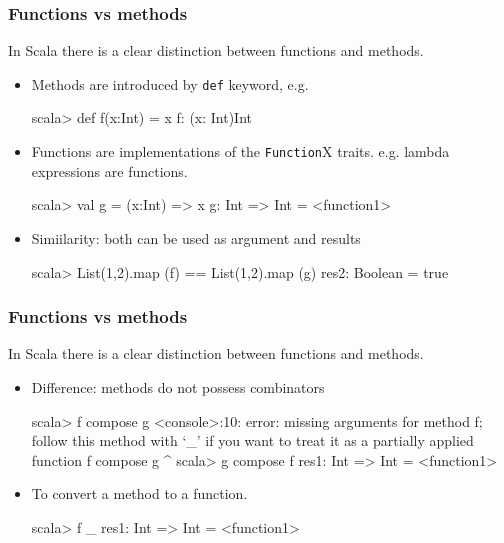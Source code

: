 \documentclass{beamer}
\begin{document}
\begin{frame}[fragile]
\frametitle{Functions vs methods}

In Scala there is a clear distinction between functions and methods.
\begin{itemize}
\item Methods are introduced by {\tt def} keyword, e.g. 
\begin{code}
scala> def f(x:Int) = x
f: (x: Int)Int
\end{code}
\item Functions are implementations of the 
{\tt Function}X traits. e.g. lambda expressions are functions. 
\begin{code}
scala> val g = (x:Int) => x
g: Int => Int = <function1>
\end{code}
\item Simiilarity: both can be used as argument and results
\begin{code}
scala> List(1,2).map (f) == List(1,2).map (g)
res2: Boolean = true
\end{code}
\end{itemize}

\end{frame}
\begin{frame}[fragile]
\frametitle{Functions vs methods}

In Scala there is a clear distinction between functions and methods.
\begin{itemize}
\item Difference: methods do not possess combinators
\begin{code}
scala> f compose g
<console>:10: error: missing arguments for method f;
follow this method with `_' if you want to treat it 
as a partially applied function
              f compose g
              ^
scala> g compose f
res1: Int => Int = <function1>
\end{code}
\item To convert a method to a function.
\begin{code}
scala> f _
res1: Int => Int = <function1>
\end{code}
\end{itemize}

\end{frame}
\end{document}
